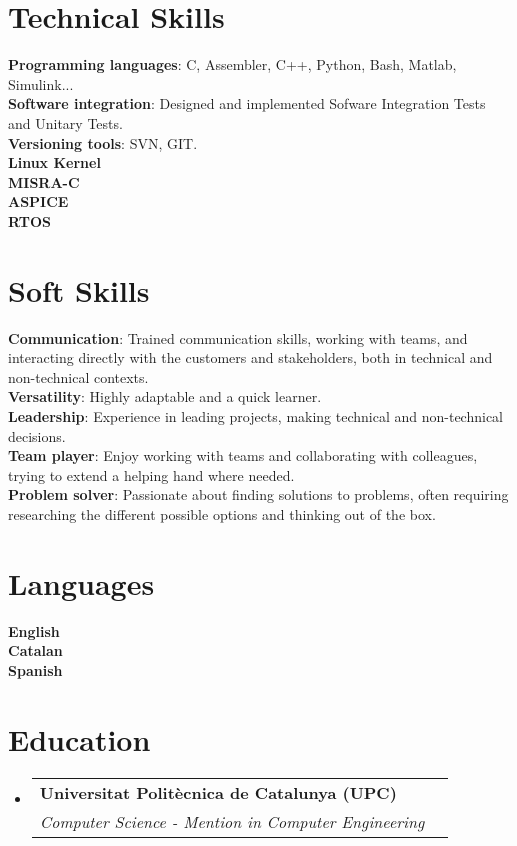 \documentclass[letterpaper,11pt]{article}
\makeatletter
\newcommand{\resumeSubheading}[4]{
  \vspace{-2pt}\item
    \begin{tabular*}{0.97\textwidth}[t]{l@{\extracolsep{\fill}}r}
      \textbf{#1} & #2 \\
      \textit{\small#3} & \textit{\small #4} \\
    \end{tabular*}\vspace{-7pt}
}
\newcommand{\resumeSubHeadingListStart}{\begin{itemize}[leftmargin=0.15in, label={}]}
\newcommand{\resumeSubHeadingListEnd}{\end{itemize}}
\makeatother
\begin{document}
%
\section{Technical Skills}
 \begin{itemize}[leftmargin=0.15in, label={}]
    \small{\item{
     \textbf{Programming languages}{: C, Assembler, C++, Python, Bash, Matlab, Simulink...} \\
     \textbf{Software integration}{: Designed and implemented Sofware Integration Tests and Unitary Tests.} \\
     \textbf{Versioning tools}{: SVN, GIT.} \\
     \textbf{Linux Kernel}{} \\
     \textbf{MISRA-C}{} \\
     \textbf{ASPICE}{} \\
     \textbf{RTOS}{} \\

    }}
 \end{itemize}

\section{Soft Skills}
 \begin{itemize}[leftmargin=0.15in, label={}]
    \small{\item{
     \textbf{Communication}{: Trained communication skills, working with teams, and interacting directly with the customers and stakeholders, both in technical and non-technical contexts. } \\
     \textbf{Versatility}{: Highly adaptable and a quick learner.} \\
     \textbf{Leadership}{: Experience in leading projects, making technical and non-technical decisions.} \\
     \textbf{Team player}{: Enjoy working with teams and collaborating with colleagues, trying to extend a helping hand where needed.} \\
     \textbf{Problem solver}{: Passionate about finding solutions to problems, often requiring researching the different possible options and thinking out of the box.} \\
    }}
 \end{itemize}

\section{Languages}
 \begin{itemize}[leftmargin=0.15in, label={}]
    \small{\item{
     \textbf{English}{ } \\
     \textbf{Catalan}{ } \\
     \textbf{Spanish}{ } \\
    }}
 \end{itemize}

\section{Education}
  \resumeSubHeadingListStart
    \resumeSubheading
      {Universitat Politècnica de Catalunya (UPC)}{}
      {Computer Science - Mention in Computer Engineering}{}
  \resumeSubHeadingListEnd


\end{document}
